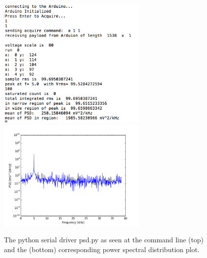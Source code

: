 \documentclass[12pt]{article}
\begin{document}
\begin{figure}[htbp]
\begin{center}
{\includegraphics[width=0.65\textwidth]{figs/psd_driver.png}}\\
{\includegraphics[width=0.65\textwidth]{figs/psd_5k.png}}
\end{center}
\caption{\label{fig:driver}  The python serial driver psd.py as seen at the command line (top) and the (bottom) corresponding power spectral distribution plot.}\end{figure}
\end{document}
